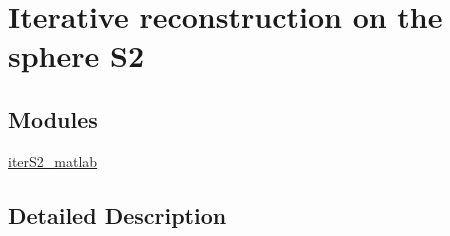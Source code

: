 \hypertarget{group__applications__iterS2}{\section{Iterative reconstruction on the sphere S2}
\label{group__applications__iterS2}
}
\subsection*{Modules}
\begin{DoxyCompactItemize}
\item 
\hyperlink{group__applications__iterS2__matlab}{iter\-S2\-\_\-matlab}
\end{DoxyCompactItemize}


\subsection{Detailed Description}
